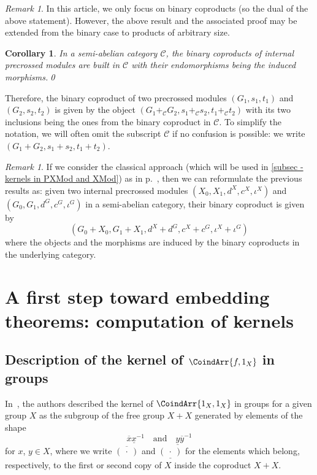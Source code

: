 \documentclass[a4paper, british, reqno]{amsart}
\newcommand*{\placeholder}{\:\cdot\:}
\newcommand{\noproof}{\qed}
\renewcommand*{\and}{,}
\renewcommand*{\and}{,}
\newcommand*{\CatSymb}[1]{\mathcal{#1}}
\newcommand*{\C}{\CatSymb{C}}
\newtheorem{corollary}[theorem]{Corollary}
\theoremstyle{definition}
\theoremstyle{remark}
\newtheorem{remark}[theorem]{Remark}
\begin{document}
\begin{remark}
	In this article, we only focus on binary coproducts (so the dual of the above statement). However, the above result and the associated proof may be extended from the binary case to products of arbitrary size.
\end{remark}

\begin{corollary}
	\label{cor: coproducts in PXMod}
	In a semi-abelian category \(\C\), the binary coproducts of internal precrossed modules are built in \(\C\) with their endomorphisms being the induced morphisms.\noproof
\end{corollary}

Therefore, the binary coproduct of two precrossed modules \((G_1, s_1, t_1)\) and \((G_2, s_2, t_2)\) is given by the object \((G_1+_{\C} G_2, s_1+_{\C} s_2, t_1+_{\C} t_2)\) with its two inclusions being the ones from the binary coproduct in \(\C\). To simplify the notation, we will often omit the subscript \(\C\) if no confusion is possible: we write \((G_1+ G_2, s_1+ s_2, t_1+ t_2)\).

\begin{remark}
	\label{rem - binary coproducts usual definition}
	If we consider the classical approach (which will be used in \cref{subsec - kernels in PXMod and XMod}) as in p.~\pageref{def - usual def RG}, then we can reformulate the previous results as: given two internal precrossed modules \((X_0	,X_1, d^X, c^X, \iota^X)\) and \((G_0,G_1,d^G,c^G,\iota^G)\) in a semi-abelian category, their binary coproduct is given by
	\[
		(G_0+X_0, G_1+X_1, d^X+d^G, c^X+c^G, \iota^X+\iota^G)
	\]
	where the objects and the morphisms are induced by the binary coproducts in the underlying category.
\end{remark}



\section{A first step toward embedding theorems: computation of kernels}\label{sec - embedding theorem}
\subsection{Description of the kernel of \texorpdfstring{\(\CoindArr{f \and 1_X}\)}{⟨f,1\_X⟩} in groups}\label{subsect - Ker in Grp}
In~\cite{CRVdL}, the authors described the kernel of \(\CoindArr{1_X \and 1_X}\) in groups for a given group \(X\) as the subgroup of the free group \(X+X\) generated by elements of the shape
\[
	\overline{x}\underline{x}^{-1} \quad\text{and}\quad \underline{y}\overline{y}^{-1}
\]
for \(x\), \(y\in X\), where we write \(\overline{(\placeholder)}\) and \(\underline{(\placeholder)}\) for the elements which belong, respectively, to the first or second copy of \(X\) inside the coproduct \(X+X\).
\end{document}
